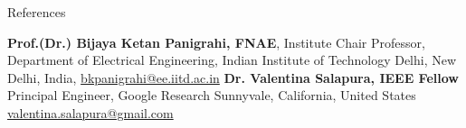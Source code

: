 
\begin{rubric}{References}

\entry*[] \textbf{Prof.(Dr.) Bijaya Ketan Panigrahi, FNAE}, 
Institute Chair Professor, 
Department of Electrical Engineering,
Indian Institute of Technology Delhi, New Delhi, India,
\url{bkpanigrahi@ee.iitd.ac.in}
\entry*[]\textbf{Dr. Valentina Salapura, IEEE Fellow}
Principal Engineer, Google Research
Sunnyvale, California, United States 
\url{valentina.salapura@gmail.com}
\end{rubric}